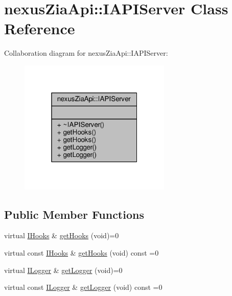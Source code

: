 \hypertarget{classnexusZiaApi_1_1IAPIServer}{}\section{nexus\+Zia\+Api\+:\+:I\+A\+P\+I\+Server Class Reference}
\label{classnexusZiaApi_1_1IAPIServer}


Collaboration diagram for nexus\+Zia\+Api\+:\+:I\+A\+P\+I\+Server\+:\nopagebreak
\begin{figure}[H]
\begin{center}
\leavevmode
\includegraphics[width=205pt]{classnexusZiaApi_1_1IAPIServer__coll__graph}
\end{center}
\end{figure}
\subsection*{Public Member Functions}
\begin{DoxyCompactItemize}
\item 
virtual \hyperlink{classnexusZiaApi_1_1IHooks}{I\+Hooks} \& \hyperlink{classnexusZiaApi_1_1IAPIServer_ab413ab768d87a8eb41dab45267a54d87}{get\+Hooks} (void)=0
\item 
virtual const \hyperlink{classnexusZiaApi_1_1IHooks}{I\+Hooks} \& \hyperlink{classnexusZiaApi_1_1IAPIServer_aed66cf66c3ccd9f8529a0ea790ae905d}{get\+Hooks} (void) const =0
\item 
virtual \hyperlink{classnexusZiaApi_1_1ILogger}{I\+Logger} \& \hyperlink{classnexusZiaApi_1_1IAPIServer_a534d79505ae46b06c633080cc6fe3fdd}{get\+Logger} (void)=0
\item 
virtual const \hyperlink{classnexusZiaApi_1_1ILogger}{I\+Logger} \& \hyperlink{classnexusZiaApi_1_1IAPIServer_a8304099597c8e182817fbeb66dcb1a59}{get\+Logger} (void) const =0
\end{DoxyCompactItemize}


